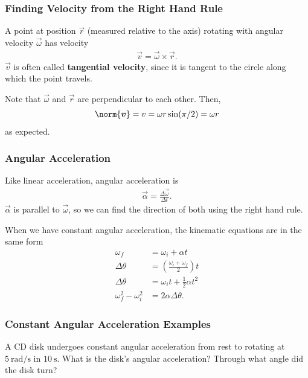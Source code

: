 \documentclass[20pt]{beamer}
\begin{document}
\begin{frame}
	\frametitle{Finding Velocity from the Right Hand Rule}
	\begin{theorem}
		A point at position $\vec{r}$ (measured relative to the axis) rotating with angular velocity $\vec{\omega}$ has velocity
		\begin{align*}
			\vec{v} = \vec{\omega} \times \vec{r}.
		\end{align*}
		$\vec{v}$ is often called \textbf{tangential velocity}, since it is tangent to the circle along which the point travels.
	\end{theorem}
	\begin{figure}[ht]
		\centering
		\label{fig:velcrossproduct}
	\end{figure}
	Note that $\vec{\omega}$ and $\vec{r}$ are perpendicular to each other. Then,
	\begin{align*}
		\norm{\vec{v}} = v = \omega r \sin (\pi / 2) = \omega r
	\end{align*}
	as expected.
\end{frame}

\begin{frame}
	\frametitle{Angular Acceleration}
	\begin{definition}
		Like linear acceleration, angular acceleration is
		\begin{align*}
			\vec{\alpha} = \frac{\Delta \vec{\omega}}{\Delta t}.
		\end{align*}
		$\vec{\alpha}$ is parallel to $\vec{\omega}$, so we can find the direction of both using the right hand rule.
	\end{definition}
	\begin{theorem}
		When we have constant angular acceleration, the kinematic equations are in the same form
		\begin{align*}
			\omega_f                & = \omega_i + \alpha t                          \\
			\Delta \theta           & = \left(\frac{\omega_i + \omega_f}{2}\right) t \\
			\Delta \theta           & = \omega_i t + \frac{1}{2}\alpha t^2           \\
			\omega_f^2 - \omega_i^2 & = 2 \alpha \Delta \theta.
		\end{align*}
	\end{theorem}
\end{frame}

\begin{frame}
	\frametitle{Constant Angular Acceleration Examples}
	\begin{example}
		A CD disk undergoes constant angular acceleration from rest to rotating at $\SI{5}{\radian/\second}$ in $\SI{10}{\second}$. What is the disk's angular acceleration? Through what angle did the disk turn?
	\end{example}
\end{frame}
\end{document}
